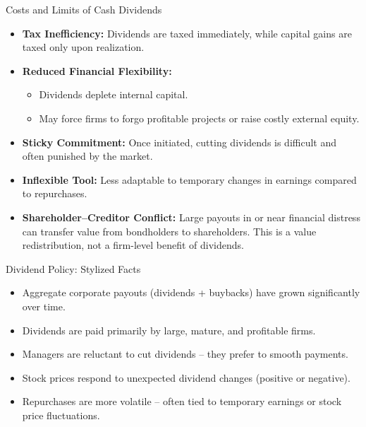 \begin{frame}{Costs and Limits of Cash Dividends}
\footnotesize
\begin{itemize}
    \item \textbf{Tax Inefficiency:} Dividends are taxed immediately, while capital gains are taxed only upon realization.

    \item \textbf{Reduced Financial Flexibility:}
    \begin{itemize}
        \item Dividends deplete internal capital.
        \item May force firms to forgo profitable projects or raise costly external equity.
    \end{itemize}

    \item \textbf{Sticky Commitment:} Once initiated, cutting dividends is difficult and often punished by the market.
    
    \item \textbf{Inflexible Tool:} Less adaptable to temporary changes in earnings compared to repurchases.

    \item \textbf{Shareholder--Creditor Conflict:} Large payouts in or near financial distress can transfer value from bondholders to shareholders. This is a value redistribution, not a firm-level benefit of dividends.
\end{itemize}
\end{frame}

\begin{frame}{Dividend Policy: Stylized Facts}
\begin{itemize}
    \item Aggregate corporate payouts (dividends + buybacks) have grown significantly over time.
    \item Dividends are paid primarily by large, mature, and profitable firms.
    \item Managers are reluctant to cut dividends -- they prefer to smooth payments.
    \item Stock prices respond to unexpected dividend changes (positive or negative).
    \item Repurchases are more volatile -- often tied to temporary earnings or stock price fluctuations.
\end{itemize}
\end{frame}


